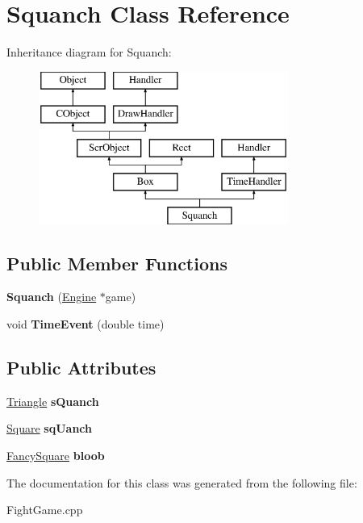\hypertarget{class_squanch}{}\section{Squanch Class Reference}
\label{class_squanch}
Inheritance diagram for Squanch\+:\begin{figure}[H]
\begin{center}
\leavevmode
\includegraphics[height=5.000000cm]{class_squanch}
\end{center}
\end{figure}
\subsection*{Public Member Functions}
\begin{DoxyCompactItemize}
\item 
\hypertarget{class_squanch_a6f3df76cfe32e677fdb1c3f4deec2134}{}\label{class_squanch_a6f3df76cfe32e677fdb1c3f4deec2134} 
{\bfseries Squanch} (\hyperlink{class_engine}{Engine} $\ast$game)
\item 
\hypertarget{class_squanch_aecdaa05a52fccbab36eee1702551901e}{}\label{class_squanch_aecdaa05a52fccbab36eee1702551901e} 
void {\bfseries Time\+Event} (double time)
\end{DoxyCompactItemize}
\subsection*{Public Attributes}
\begin{DoxyCompactItemize}
\item 
\hypertarget{class_squanch_a2421d90cee721efa94fce63a881aef5c}{}\label{class_squanch_a2421d90cee721efa94fce63a881aef5c} 
\hyperlink{class_triangle}{Triangle} {\bfseries s\+Quanch}
\item 
\hypertarget{class_squanch_ada1a0d7bb3d52fa9c43515d9a6a19322}{}\label{class_squanch_ada1a0d7bb3d52fa9c43515d9a6a19322} 
\hyperlink{class_square}{Square} {\bfseries sq\+Uanch}
\item 
\hypertarget{class_squanch_a782c18e8f235d328fbca1a67f2565cb6}{}\label{class_squanch_a782c18e8f235d328fbca1a67f2565cb6} 
\hyperlink{class_fancy_square}{Fancy\+Square} {\bfseries bloob}
\end{DoxyCompactItemize}


The documentation for this class was generated from the following file\+:\begin{DoxyCompactItemize}
\item 
Fight\+Game.\+cpp\end{DoxyCompactItemize}
